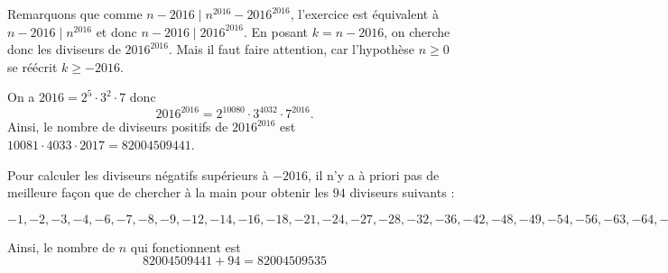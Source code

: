 
Remarquons que comme $n-2016\mid n^{2016}-2016^{2016}$, l'exercice est équivalent à $n-2016\mid n^{2016}$ et donc $n-2016\mid 2016^{2016}$. En posant $k=n-2016$, on cherche donc les diviseurs de $2016^2016$. Mais il faut faire attention, car l'hypothèse $n\ge 0$ se réécrit $k\ge -2016$.

On a $2016=2^{5}\cdot 3^2\cdot 7$ donc
$$2016^{2016}=2^{10080}\cdot 3^{4032}\cdot 7^{2016}.$$
Ainsi, le nombre de diviseurs positifs de $2016^{2016}$ est $10081\cdot 4033\cdot 2017=82004509441$.

Pour calculer les diviseurs négatifs supérieurs à $-2016$, il n'y a à priori pas de meilleure façon que de chercher à la main pour obtenir les $94$ diviseurs suivants :

$-1,-2,-3,-4,-6,-7,-8,-9,-12,-14,-16,-18,-21,-24,-27,-28,-32,-36,-42,-48,-49,-54,-56,-63,-64,-72,-81,-84,-96,-98,-108,-112,-126,-128,-144,-147,-162,-168,-189,-192,-196,-216,-224,-243,-252,-256,-288,-294,-324,-336,-343,-378,-384,-392,-432,-441,-448,-486,-504,-512,-567,-576,-588,-648,-672,-686,-729,-756,-768,-784,-864,-882,-896,-972,-1008,-1024,-1029,-1134,-1152,-1176,-1296,-1323,-1344,-1372,-1458,-1512,-1536,-1568,-1701,-1728,-1764,-1792,-1944,-2016$

Ainsi, le nombre de $n$ qui fonctionnent est
$$82004509441+94=82004509535$$